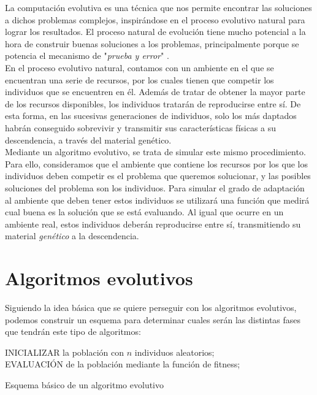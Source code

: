La computación evolutiva es una técnica que nos permite encontrar las soluciones a dichos problemas complejos, inspirándose en el proceso evolutivo natural para lograr los resultados. El proceso natural de evolución tiene mucho potencial a la hora de construir buenas soluciones a los problemas, principalmente porque se potencia el mecanismo de "\textit{prueba y error}" \cite{holland1973genetic}. \\

En el proceso evolutivo natural, contamos con un ambiente en el que se encuentran una serie de recursos, por los cuales tienen que competir los individuos que se encuentren en él. Además de tratar de obtener la mayor parte de los recursos disponibles, los individuos tratarán de reproducirse entre sí. De esta forma, en las sucesivas generaciones de individuos, solo los más daptados habrán conseguido sobrevivir y transmitir sus características físicas a su descendencia, a través del material genético. \\

Mediante un algoritmo evolutivo, se trata de simular este mismo procedimiento. Para ello, consideramos que el ambiente que contiene los recursos por los que los individuos deben competir es el problema que queremos solucionar, y las posibles soluciones del problema son los individuos. Para simular el grado de adaptación al ambiente que deben tener estos individuos se utilizará una función que medirá cual buena es la solución que se está evaluando. Al igual que ocurre en un ambiente real, estos individuos deberán reproducirse entre sí, transmitiendo su material \textit{genético} a la descendencia. \\

\section{Algoritmos evolutivos}
\label{1:sec:3}

Siguiendo la idea básica que se quiere perseguir con los algoritmos evolutivos, podemos construir un esquema para determinar cuales serán las distintas fases que tendrán este tipo de algoritmos:

\begin{algorithm}[H]
 INICIALIZAR la población con $n$ individuos aleatorios;\\
 EVALUACIÓN de la población mediante la función de fitness;
 
 \caption{Esquema básico de un algoritmo evolutivo}
\end{algorithm}

